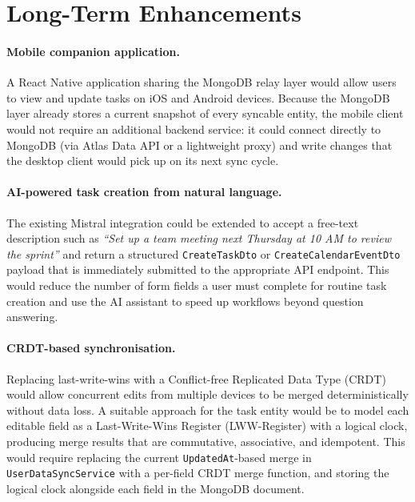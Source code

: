 \section{Long-Term Enhancements}\label{sec:fw_longterm}

\paragraph{Mobile companion application.}
A React Native application sharing the MongoDB relay layer would allow users to view
and update tasks on iOS and Android devices.
Because the MongoDB layer already stores a current snapshot of every syncable entity,
the mobile client would not require an additional backend service: it could connect
directly to MongoDB (via Atlas Data API or a lightweight proxy) and write changes that
the desktop client would pick up on its next sync cycle.

\paragraph{AI-powered task creation from natural language.}
The existing Mistral integration could be extended to accept a free-text description
such as \emph{``Set up a team meeting next Thursday at 10 AM to review the sprint''}
and return a structured \texttt{CreateTaskDto} or \texttt{CreateCalendarEventDto}
payload that is immediately submitted to the appropriate API endpoint.
This would reduce the number of form fields a user must complete for routine task
creation and use the AI assistant to speed up workflows beyond
question answering.

\paragraph{CRDT-based synchronisation.}
Replacing last-write-wins with a Conflict-free Replicated Data Type (CRDT) would allow
concurrent edits from multiple devices to be merged deterministically without data
loss.
A suitable approach for the task entity would be to model each editable field as a
Last-Write-Wins Register (LWW-Register) with a logical clock, producing merge results
that are commutative, associative, and idempotent.
This would require replacing the current \texttt{UpdatedAt}-based merge in
\texttt{UserDataSyncService} with a per-field CRDT merge function, and storing the
logical clock alongside each field in the MongoDB document.

